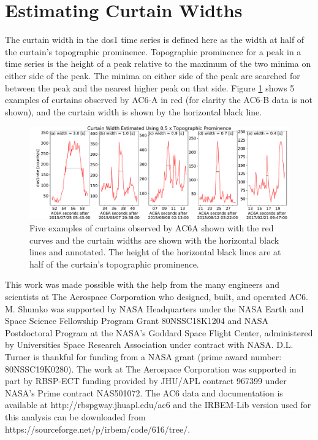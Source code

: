 \documentclass[draft]{agujournal2019}
\begin{document}
\section{Estimating Curtain Widths} \label{appendix_b}
The curtain width in the dos1 time series is defined here as the width at half of the curtain's topographic prominence. Topographic prominence for a peak in a time series is the height of a peak relative to the maximum of the two minima on either side of the peak. The minima on either side of the peak are searched for between the peak and the nearest higher peak on that side. Figure \ref{a_topographic_prominence} shows 5 examples of curtains observed by AC6-A in red (for clarity the AC6-B data is not shown), and the curtain width is shown by the horizontal black line.

\begin{figure}
\includegraphics[width=\textwidth]{a_topographic_prominence.pdf}
\caption{Five examples of curtains observed by AC6A shown with the red curves and the curtain widths are shown with the horizontal black lines and annotated. The height of the horizontal black lines are at half of the curtain's topographic prominence.}
\label{a_topographic_prominence}
\end{figure}

\acknowledgments
This work was made possible with the help from the many engineers and scientists at The Aerospace Corporation who designed, built, and operated AC6. M. Shumko was supported by NASA Headquarters under the NASA Earth and Space Science Fellowship Program Grant 80NSSC18K1204 and NASA Postdoctoral Program at the NASA's Goddard Space Flight Center, administered by Universities Space Research Association under contract with NASA. D.L. Turner is thankful for funding from a NASA grant (prime award number: 80NSSC19K0280).  The work at The Aerospace Corporation was supported in part by RBSP-ECT funding provided by JHU/APL contract 967399 under NASA's Prime contract NAS501072. The AC6 data and documentation is available at http://rbspgway.jhuapl.edu/ac6 and the IRBEM-Lib version used for this analysis can be downloaded from \\ \noindent https://sourceforge.net/p/irbem/code/616/tree/. 


%
\end{document}
